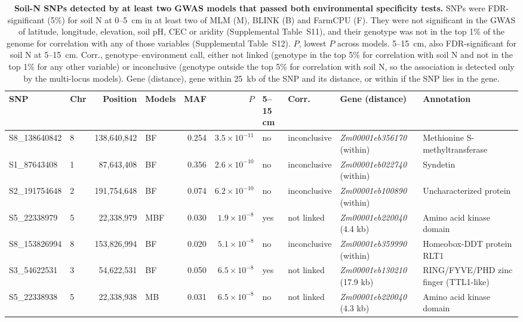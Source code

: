 \documentclass[namedate,unnumsec,webpdf,contemporary,large]{oup-authoring-template}
\begin{document}
\begin{table}[ht]
  \centering
  \scriptsize
  \caption{\textbf{Soil-N SNPs detected by at least two GWAS models that passed both environmental specificity tests.} SNPs were FDR-significant (5\%) for soil N at 0--5~cm in at least two of MLM (M), BLINK (B) and FarmCPU (F). They were not significant in the GWAS of latitude, longitude, elevation, soil pH, CEC or aridity (Supplemental Table~S11), and their genotype was not in the top 1\% of the genome for correlation with any of those variables (Supplemental Table~S12). $P$, lowest $P$ across models. 5--15~cm, also FDR-significant for soil N at 5--15~cm. Corr., genotype--environment call, either not linked (genotype in the top 5\% for correlation with soil N and not in the top 1\% for any other variable) or inconclusive (genotype outside the top 5\% for correlation with soil N, so the association is detected only by the multi-locus models). Gene (distance), gene within 25~kb of the SNP and its distance, or within if the SNP lies in the gene.}
  \label{tab:soilN_specific}
  \begin{tabular}{llrlrrllll}
  \hline
  SNP & Chr & Position & Models & MAF & $P$ & 5--15 cm & Corr. & Gene (distance) & Annotation \\
  \hline
  S8\_138640842 & 8 & 138,640,842 & BF  & 0.254 & $3.5\times10^{-11}$ & no  & inconclusive & \textit{Zm00001eb356170} (within) & Methionine S-methyltransferase \\
  S1\_87643408  & 1 &  87,643,408 & BF  & 0.356 & $2.6\times10^{-10}$ & no  & inconclusive & \textit{Zm00001eb022740} (within) & Syndetin \\
  S2\_191754648 & 2 & 191,754,648 & BF  & 0.074 & $6.2\times10^{-10}$ & no  & inconclusive & \textit{Zm00001eb100890} (within) & Uncharacterized protein \\
  S5\_22338979  & 5 &  22,338,979 & MBF & 0.030 & $1.9\times10^{-8}$  & yes & not linked   & \textit{Zm00001eb220040} (4.4 kb) & Amino acid kinase domain \\
  S8\_153826994 & 8 & 153,826,994 & BF  & 0.020 & $5.1\times10^{-8}$  & no  & inconclusive & \textit{Zm00001eb359990} (within) & Homeobox-DDT protein RLT1 \\
  S3\_54622531  & 3 &  54,622,531 & BF  & 0.050 & $6.5\times10^{-8}$  & yes & not linked   & \textit{Zm00001eb130210} (17.9 kb) & RING/FYVE/PHD zinc finger (TTL1-like) \\
  S5\_22338938  & 5 &  22,338,938 & MB  & 0.031 & $6.5\times10^{-8}$  & no  & not linked   & \textit{Zm00001eb220040} (4.3 kb) & Amino acid kinase domain \\

\end{tabular}
\end{table}
\end{document}

